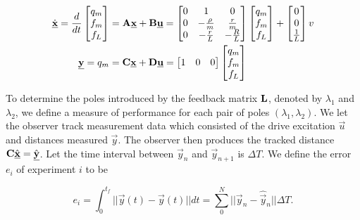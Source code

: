 \documentclass[11pt,titlepage]{report}
\begin{document}
\begin{align} \label{eq:ctrl-bond-model}
	\dot{\mathbf{\underline{x}}} = \frac{d}{dt}
	\begin{bmatrix}
		q_m \\
		f_m \\
		f_L
	\end{bmatrix} &= \mathbf{A} \mathbf{\underline{x}} + \mathbf{B} \mathbf{\underline{u}} =
	\begin{bmatrix}
		0 & 1 & 0 \\
		0 & -\frac{\rho}{m} & \frac{r}{m} \\
		0 & -\frac{r}{L} & -\frac{R}{L}
	\end{bmatrix}
	\begin{bmatrix}
		q_m \\
		f_m \\
		f_L
	\end{bmatrix} +
	\begin{bmatrix}
		0 \\
		0 \\
		\frac{1}{L}
	\end{bmatrix} v \\
	\mathbf{\underline{y}} = q_m &= \mathbf{C} \mathbf{\underline{x}} + \mathbf{D} \mathbf{\underline{u}} =
	\begin{bmatrix}
		1 & 0 & 0
	\end{bmatrix}
	\begin{bmatrix}
		q_m \\
		f_m \\
		f_L
	\end{bmatrix}
\end{align}

To determine the poles introduced by the feedback matrix $\mathbf{L}$, denoted by $\lambda_1$ and $\lambda_2$, we define a measure of performance for each pair of poles $(\lambda_1,\lambda_2)$. We let the observer track measurement data which consisted of the drive excitation $\vec{u}$ and distances measured $\vec{y}$. The observer then produces the tracked distance $\mathbf{C} \hat{\mathbf{\underline{x}}} = \hat{\mathbf{\underline{y}}}$. Let the time interval between $\vec{y}_n$ and $\vec{y}_{n+1}$ is $\Delta T$. We define the error $e_i$ of experiment $i$ to be

\begin{equation*} \label{ctrl:err}
	e_i = \int_{0}^{t_f} || \vec{y}(t) - \hat{\vec{y}}(t) || dt = \sum_{0}^{N} ||\vec{y}_n - \hat{\vec{y}}_n || \Delta T.
\end{equation*}
\end{document}
